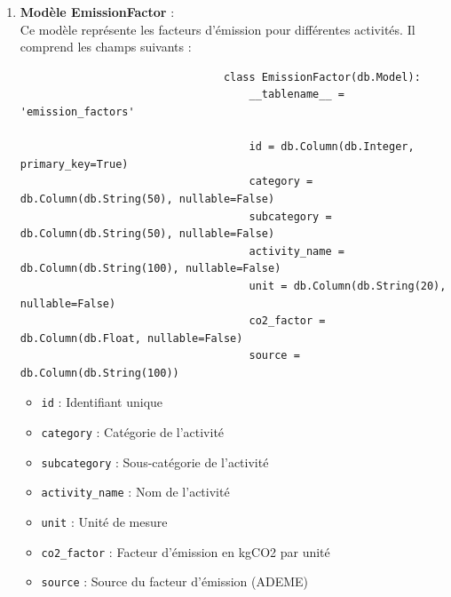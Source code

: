 \documentclass[a4paper,11pt]{article}
\begin{document}
                \begin{enumerate}
                    \item \textbf{Modèle EmissionFactor} :\\
                        Ce modèle représente les facteurs d'émission pour différentes activités. Il comprend les champs suivants :

                        \begin{tcolorbox}[colback=lightgray!6, colframe=black, left=-45mm, right=5mm, top=2mm, bottom=0mm, boxrule=0.1mm]
                            \begin{verbatim}
                                class EmissionFactor(db.Model):
                                    __tablename__ = 'emission_factors'
                                    
                                    id = db.Column(db.Integer, primary_key=True)
                                    category = db.Column(db.String(50), nullable=False)
                                    subcategory = db.Column(db.String(50), nullable=False)
                                    activity_name = db.Column(db.String(100), nullable=False)
                                    unit = db.Column(db.String(20), nullable=False)
                                    co2_factor = db.Column(db.Float, nullable=False)
                                    source = db.Column(db.String(100))
                            \end{verbatim}
                        \end{tcolorbox}

                        \begin{itemize}
                            \item \texttt{id} : Identifiant unique
                            \item \texttt{category} : Catégorie de l'activité
                            \item \texttt{subcategory} : Sous-catégorie de l'activité
                            \item \texttt{activity\_name} : Nom de l'activité
                            \item \texttt{unit} : Unité de mesure
                            \item \texttt{co2\_factor} : Facteur d'émission en kgCO2 par unité
                            \item \texttt{source} : Source du facteur d'émission (ADEME)
                        \end{itemize}


\end{enumerate}
\end{document}
